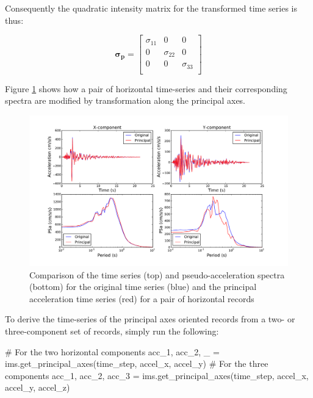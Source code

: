 Consequently the quadratic intensity matrix for the transformed time series is thus:

\begin{equation}
\mathbf{\sigma_p} = \begin{bmatrix}
\sigma_{11} & 0 & 0 \\
0 & \sigma_{22} & 0 \\
0 & 0 & \sigma_{33} \\
\end{bmatrix}
\end{equation}

Figure \ref{fig:principal_axes} shows how a pair of horizontal time-series and their corresponding spectra are modified by transformation along the principal axes.

\begin{figure}[htb]
	\centering
		\includegraphics[width=\textwidth]{./figures/ims/PrincipalAxesExample.pdf}
	\caption{Comparison of the time series (top) and pseudo-acceleration spectra (bottom) for the original time series (blue) and the principal acceleration time series (red) for a pair of horizontal records}
	\label{fig:principal_axes}
\end{figure}

To derive the time-series of the principal axes oriented records from a two- or three-component set of records, simply run the following:

\begin{python}
# For the two horizontal components
acc_1, acc_2, _ = ims.get_principal_axes(time_step,
                                         accel_x,
                                         accel_y)
# For the three components
acc_1, acc_2, acc_3 = ims.get_principal_axes(time_step,
                                             accel_x,
                                             accel_y,
                                             accel_z)
\end{python}

